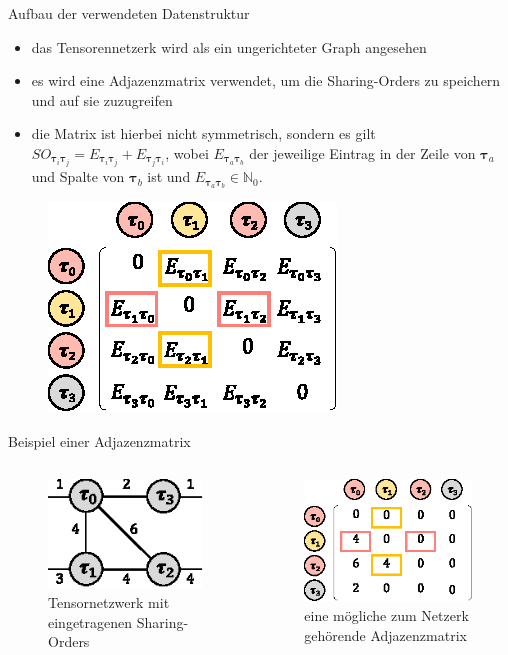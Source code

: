 \documentclass{beamer}
\begin{document}
\begin{frame}{Aufbau der verwendeten Datenstruktur}
	\begin{itemize}
		\item das Tensorennetzerk wird als ein ungerichteter Graph angesehen
		\item es wird eine Adjazenzmatrix verwendet, um die Sharing-Orders zu speichern und auf sie zuzugreifen
		\item die Matrix ist hierbei nicht symmetrisch,
		      sondern es gilt $SO_{\bm{\tau}_i \bm{\tau}_j} = E_{\bm{\tau}_i \bm{\tau}_j} + E_{\bm{\tau}_j \bm{\tau}_i}$, wobei $E_{\bm{\tau}_a \bm{\tau}_b}$ der jeweilige Eintrag in der Zeile von $\bm{\tau}_a$ und Spalte von $\bm{\tau}_b$ ist und $E_{\bm{\tau}_a \bm{\tau}_b} \in \mathbb{N}_0$.
	\end{itemize}
	\begin{figure}
		\includegraphics{figure_05_a}
	\end{figure}
\end{frame}

\begin{frame}{Beispiel einer Adjazenzmatrix}
	\begin{columns}
		\begin{figure}
			\includegraphics[scale=1.7]{figure_03_a_mid}
			\caption*{Tensornetzwerk mit eingetragenen Sharing-Orders}
		\end{figure}
		\begin{figure}
			\includegraphics[scale=1.3]{figure_05_c}
			\caption*{eine mögliche zum Netzerk gehörende Adjazenzmatrix}
		\end{figure}
	\end{columns}
\end{frame}
\end{document}
